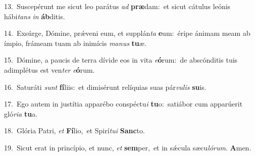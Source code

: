 {\numbfont\textcolor{\numbcolor}{13.}}~Suscepérunt me sicut leo parátus \textit{ad} \textbf{præ}\-dam:~\star et sicut cátulus leónis hábi\textit{tans} \textit{in} \textbf{áb}\-ditis.\par
{\numbfont\textcolor{\numbcolor}{14.}}~Exsúrge, Dómine, prǽveni eum, et supplán\textit{ta} \textbf{e}\-um:~\star éripe ánimam meam ab ímpio, frámeam tuam ab inimícis \textit{ma}\-\textit{nus} \textbf{tu}\-æ.\par
{\numbfont\textcolor{\numbcolor}{15.}}~Dómine, a paucis de terra dívide eos in vita \textit{e}\-\textbf{ó}rum:~\star de abscónditis tuis adimplétus est ven\textit{ter} \textit{e}\-\textbf{ó}rum.\par
{\numbfont\textcolor{\numbcolor}{16.}}~Saturáti \textit{sunt} \textbf{fí}\-liis:~\star et dimisérunt relíquias suas pár\-\textit{vu}\-\textit{lis} \textbf{su}\-is.\par
{\numbfont\textcolor{\numbcolor}{17.}}~Ego autem in justítia apparébo conspéctu\textit{i} \textbf{tu}\-o:~\star satiábor cum apparúerit gló\-\textit{ri}\-\textit{a} \textbf{tu}\-a.\par
{\numbfont\textcolor{\numbcolor}{18.}}~Glória Patri, \textit{et} \textbf{Fí}\-lio,~\star et Spirí\-\textit{tu}\-\textit{i} \textbf{Sanc}\-to.\par
{\numbfont\textcolor{\numbcolor}{19.}}~Sicut erat in princípio, et nunc, \textit{et} \textbf{sem}\-per,~\star et in sǽcula sæcu\-\textit{ló}\-\textit{rum}. \textbf{A}\-men.\par
